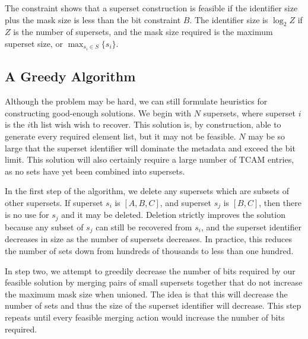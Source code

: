 The constraint shows that a superset construction is feasible if the identifier size plus the mask size is less than the bit constraint $B$. The identifier size is $\log_2{Z}$ if $Z$ is the number of supersets, and the mask size required is the maximum superset size, or $\max_{s_i \in S}\{s_i\}$.


\subsection{A Greedy Algorithm}

Although the problem may be hard, we can still formulate heuristics for constructing good-enough solutions. We begin with $N$ supersets, where superset $i$ is the $i$th list wish wish to recover. This solution is, by construction, able to generate every required element list, but it may not be feasible. $N$ may be so large that the superset identifier will dominate the metadata and exceed the bit limit. This solution will also certainly require a large number of TCAM entries, as no sets have yet been combined into supersets.

In the first step of the algorithm, we delete any supersets which are subsets of other supersets. If superset $s_i$ is $[A,B,C]$, and superset $s_j$ is $[B,C]$, then there is no use for $s_j$ and it may be deleted. Deletion strictly improves the solution because any subset of $s_j$ can still be recovered from $s_i$, and the superset identifier decreases in size as the number of supersets decreases. In practice, this reduces the number of sets down from hundreds of thousands to less than one hundred.

In step two, we attempt to greedily decrease the number of bits required by our feasible solution by merging pairs of small supersets together that do not increase the maximum mask size when unioned. The idea is that this will decrease the number of sets and thus the size of the superset identifier will decrease. This step repeats until every feasible merging action would increase the number of bits required. 

